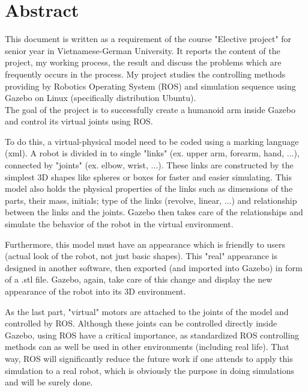 \documentclass[pdftex,12pt,a4paper]{article}
\begin{document}
  
  
  
  \newpage
  \tableofcontents
  \listoffigures
  
  \setlength{\parindent}{0em}
  \setlength{\parskip}{1em}
  
  \newpage
  \section*{Abstract}
  This document is written as a requirement of the course "Elective project" for senior year in Vietnamese-German University. It reports the content of the project, my working process, the result and discuss the problems which are frequently occurs in the process.
  My project studies the controlling methods providing by Robotics Operating System (ROS) and simulation sequence using Gazebo on Linux (specifically distribution Ubuntu). \\
  The goal of the project is to successfully create a humanoid arm inside Gazebo and control its virtual joints using ROS.\par
  To do this, a virtual-physical model need to be coded using a marking language (xml). A robot is divided in to single "links" (ex. upper arm, forearm, hand, ...), connected by "joints" (ex. elbow, wrist, ...). These links are constructed by the simplest 3D shapes like spheres or boxes for faster and easier simulating. This model also holds the physical properties of the links such as dimensions of the parts, their mass, initials; type of the links (revolve, linear, ...) and relationship between the links and the joints. Gazebo then takes care of the relationships and simulate the behavior of the robot in the virtual environment.\par
  Furthermore, this model must have an appearance which is friendly to users (actual look of the robot, not just basic shapes). This "real" appearance is designed in another software, then exported (and imported into Gazebo) in form of a .stl file. Gazebo, again, take care of this change and display the new appearance of the robot into its 3D environment. \par
  As the last part, "virtual" motors are attached to the joints of the model and controlled by ROS. Although these joints can be controlled directly inside Gazebo, using ROS have a critical importance, as standardized ROS controlling methods can as well be used in other environments (including real life). That way, ROS will significantly reduce the future work if one attends to apply this simulation to a real robot, which is obviously the purpose in doing simulations and will be surely done.\par
  
\end{document}
